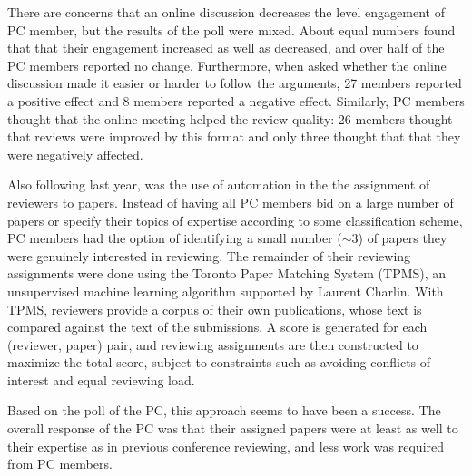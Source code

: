 There are concerns that an online discussion decreases the level engagement of
PC member, but the results of the poll were mixed. About equal numbers found
that that their engagement increased as well as decreased, and over half of
the PC members reported no change. Furthermore, when asked whether the online
discussion made it easier or harder to follow the arguments, 27 members
reported a positive effect and 8 members reported a negative effect.
Similarly, PC members thought that the online meeting helped the review
quality: 26 members thought that reviews were improved by this format and
only three thought that that they were negatively affected. 

Also following last year, was the use of automation in the the assignment of
reviewers to papers.  Instead of having all PC members bid on a large number
of papers or specify their topics of expertise according to some
classification scheme, PC members had the option of identifying a small number
($\sim\!3$) of papers they were genuinely interested in reviewing. The
remainder of their reviewing assignments were done using the Toronto Paper
Matching System (TPMS), an unsupervised machine learning algorithm supported
by Laurent Charlin. With TPMS, reviewers provide a corpus of their own
publications, whose text is compared against the text of the submissions. A
score is generated for each (reviewer, paper) pair, and reviewing assignments
are then constructed to maximize the total score, subject to constraints such
as avoiding conflicts of interest and equal reviewing load. 

Based on the poll of the PC, this approach seems to have been a success.  The
overall response of the PC was that their assigned papers were at least as
well to their expertise as in previous conference reviewing, and less work was
required from PC members.

